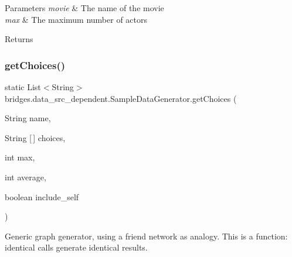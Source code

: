 \begin{DoxyParams}{Parameters}
{\em movie} & The name of the movie \\
\hline
{\em max} & The maximum number of actors \\
\hline
\end{DoxyParams}
\begin{DoxyReturn}{Returns}

\end{DoxyReturn}
\hypertarget{classbridges_1_1data__src__dependent_1_1_sample_data_generator_a5b93af083c764f1046ebb6d1b9ae8d6f}{}\label{classbridges_1_1data__src__dependent_1_1_sample_data_generator_a5b93af083c764f1046ebb6d1b9ae8d6f} 
\subsubsection{\texorpdfstring{get\+Choices()}{getChoices()}}
{\footnotesize\ttfamily static List$<$String$>$ bridges.\+data\+\_\+src\+\_\+dependent.\+Sample\+Data\+Generator.\+get\+Choices (\begin{DoxyParamCaption}\item[{String}]{name,  }\item[{String \mbox{[}$\,$\mbox{]}}]{choices,  }\item[{int}]{max,  }\item[{int}]{average,  }\item[{boolean}]{include\+\_\+self }\end{DoxyParamCaption})\hspace{0.3cm}{\ttfamily [static]}}

Generic graph generator, using a friend network as analogy. This is a function\+: identical calls generate identical results.


